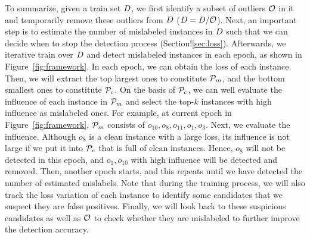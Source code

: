  To summarize, given a train set $D$, we first identify a subset of  outliers $\mathcal{O}$ in it and temporarily remove these outliers from $D$ (\ie $D = D/ \mathcal{O}$).
Next, an important step is to estimate the number of mislabeled instances in $D$ such that we can decide when to stop the detection process (Section!\ref{sec:loss}).
 Afterwards, we iterative train over $D$ and detect mislabeled instances in each epoch, as shown in Figure~\ref{fig:framework}. In each epoch, we can obtain the loss of each instance. Then, we will extract the top largest ones to constitute $\mathcal{P}_m$, and the bottom  smallest ones to constitute $\mathcal{P}_c$. On the basis of $\mathcal{P}_c$, we can well evaluate the influence of each instance in $\mathcal{P}_m$ and select the top-$k$ instances with high influence as mislabeled ones. For example, at current epoch in Figure~\ref{fig:framework}, $\mathcal{P}_m$ consists of $o_{10}, o_{8}, o_{11}, o_{1}, o_{3}$. Next, we evaluate the influence. Although $o_{8}$ is a clean instance with a large loss, its influence is not large if we put it into $\mathcal{P}_c$ that is full of clean instances. Hence, $o_{8}$ will not be detected in this epoch, and $o_{1},o_{10}$ with high influence will be detected and removed. Then, another epoch starts, and this repeats until we have detected the number of estimated mislabels. Note that during the training process, we will also track the loss variation of each instance to identify some candidates that we suspect they are false positives.
 Finally, we will look back to these suspicious candidates as well as  $\mathcal{O}$ to check whether they are mislabeled to further improve the detection accuracy.







